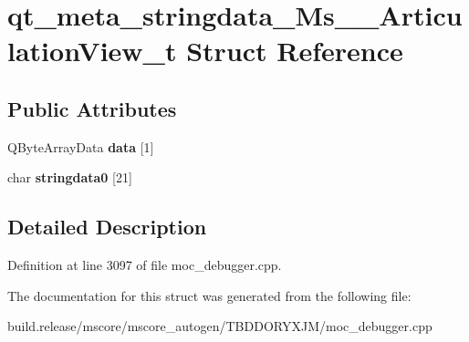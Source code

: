\hypertarget{structqt__meta__stringdata___ms_____articulation_view__t}{}\section{qt\+\_\+meta\+\_\+stringdata\+\_\+\+Ms\+\_\+\+\_\+\+Articulation\+View\+\_\+t Struct Reference}
\label{structqt__meta__stringdata___ms_____articulation_view__t}
\subsection*{Public Attributes}
\begin{DoxyCompactItemize}
\item 
\mbox{\label{structqt__meta__stringdata___ms_____articulation_view__t_a6a2ad4cef93b90617be60fd5cfc9941b}} 
Q\+Byte\+Array\+Data {\bfseries data} \mbox{[}1\mbox{]}
\item 
\mbox{\label{structqt__meta__stringdata___ms_____articulation_view__t_a577c34635a475ba7750a3a8c6ab9c597}} 
char {\bfseries stringdata0} \mbox{[}21\mbox{]}
\end{DoxyCompactItemize}


\subsection{Detailed Description}


Definition at line 3097 of file moc\+\_\+debugger.\+cpp.



The documentation for this struct was generated from the following file\+:\begin{DoxyCompactItemize}
\item 
build.\+release/mscore/mscore\+\_\+autogen/\+T\+B\+D\+D\+O\+R\+Y\+X\+J\+M/moc\+\_\+debugger.\+cpp\end{DoxyCompactItemize}
